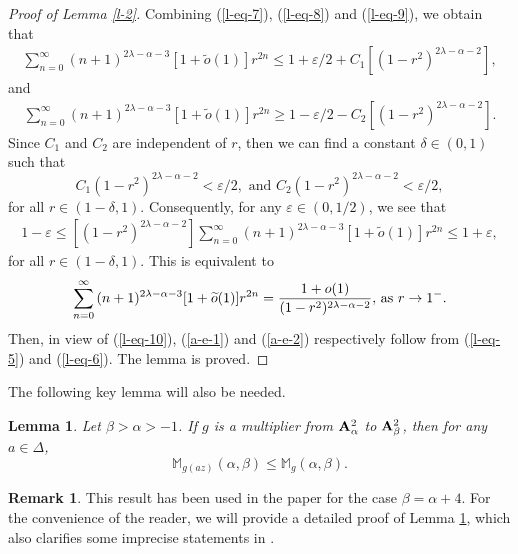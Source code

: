 \documentclass[10pt]{amsart}
\newtheorem{lemma}[theorem]{Lemma}
\theoremstyle{definition}    %
\newtheorem{remark}[theorem]{Remark}
\numberwithin{equation}{section}
\begin{document}
\begin{proof}[Proof of Lemma \ref{l-2}]
Combining (\ref{l-eq-7}), (\ref{l-eq-8}) and (\ref{l-eq-9}), we obtain that
    \begin{eqnarray}
[{(1-r^2)^{2\lambda-\alpha-2}}]\sum_{n=0}^{\infty}{(n+1)^{2\lambda-\alpha-3}}[1+\widetilde{o}(1)]r^{2n}\leq 1+\varepsilon/2+C_1[{(1-r^2)^{2\lambda-\alpha-2}}], \nonumber
 \end{eqnarray}
 and 
     \begin{eqnarray}
[{(1-r^2)^{2\lambda-\alpha-2}}]\sum_{n=0}^{\infty}{(n+1)^{2\lambda-\alpha-3}}[1+\widetilde{o}(1)]r^{2n}\geq 1-\varepsilon/2-C_2[{(1-r^2)^{2\lambda-\alpha-2}}]. \nonumber
 \end{eqnarray}
Since $C_1$ and $C_2$ are independent of $r$, then we can find a constant $\delta\in (0,1)$ such that
$$C_1{(1-r^2)^{2\lambda-\alpha-2}}<\varepsilon/2,\,\,\text{and}\,\, C_2{(1-r^2)^{2\lambda-\alpha-2}}<\varepsilon/2,$$
for all $r\in (1-\delta, 1)$. Consequently, for any $\varepsilon\in (0,1/2)$, we see that 
    \begin{eqnarray}
1-\varepsilon\leq [{(1-r^2)^{2\lambda-\alpha-2}}]\sum_{n=0}^{\infty}{(n+1)^{2\lambda-\alpha-3}}[1+\widetilde{o}(1)]r^{2n}\leq 1+\varepsilon, \nonumber
 \end{eqnarray}
for all $r\in (1-\delta, 1)$. This is equivalent to  
 \begin{equation}\label{l-eq-10}
\sum_{n=0}^{\infty}{(n+1)^{2\lambda-\alpha-3}}[1+\widetilde{o}(1)]r^{2n}=\frac{1+{o}(1)}{(1-r^2)^{2\lambda-\alpha-2}},\, {\textup{as}}\,\, r\rightarrow 1^{-}. 
 \end{equation}
 Then, in view of (\ref{l-eq-10}), (\ref{a-e-1}) and (\ref{a-e-2}) respectively follow from (\ref{l-eq-5}) and (\ref{l-eq-6}).  The lemma is proved.
 \end{proof} 
The following key lemma will also be needed.
\begin{lemma}\label{lemma-key}Let $\beta>\alpha>-1$. If $g$ is a multiplier from ${\bf A}_{\alpha}^2$ to ${\bf A}_{\beta}^2$, then for any $a\in \Delta$, 
$$\mathbb{M}_{g(az)}(\alpha, \beta)\leq \mathbb{M}_{g}(\alpha, \beta).$$
\end{lemma}
\begin{remark}
This result has been used in the paper \cite{SS} for the case $\beta=\alpha+4$. For the convenience of the reader, we will provide a detailed proof of Lemma \ref{lemma-key}, which also clarifies some imprecise statements in \cite[page 2310, lines 17-20]{Jin-1}.
\end{remark}
\end{document}
